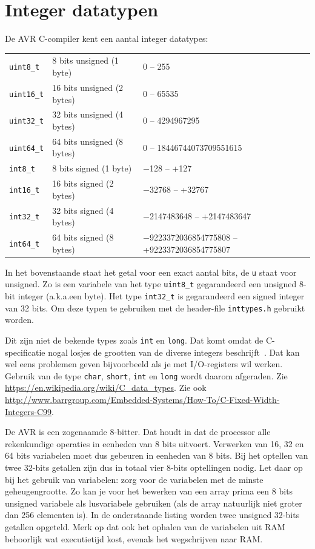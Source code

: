 \documentclass[12pt,a4paper,final,twoside,fleqn]{article}
\def\lstC{\lstinline[style=C]}
\begin{document}
\section{Integer datatypen }
\index{\lstC{uint}*\lstC{_t}}\index{\lstC{int}*\lstC{_t}}
De AVR C-compiler kent een aantal integer datatypes:

\begin{tabular}{lll}
\lstC|uint8_t| & 8 bits unsigned (1 byte) & 0 -- 255 \\ 
\lstC|uint16_t| & 16 bits unsigned (2 bytes) & 0 -- 65535 \\ 
\lstC|uint32_t| & 32 bits unsigned (4 bytes) & 0 -- 4294967295 \\
\lstC|uint64_t| & 64 bits unsigned (8 bytes) & 0 -- 18446744073709551615 \\
\lstC|int8_t| & 8 bits signed  (1 byte) & $-$128 -- +127 \\ 
\lstC|int16_t| & 16 bits signed (2 bytes) & $-$32768 -- +32767\\ 
\lstC|int32_t| & 32 bits signed (4 bytes) & $-$2147483648 -- +2147483647 \\ 
\lstC|int64_t| & 64 bits signed (8 bytes) & $-$9223372036854775808 -- +9223372036854775807 \\ 
\end{tabular}

In het bovenstaande staat het getal voor een exact aantal bits, de \lstC{u} staat voor
unsigned. Zo is een variabele van het type \lstC{uint8_t} gegarandeerd een unsigned
8-bit integer (a.k.a.\@ een byte). Het type \lstC{int32_t} is gegarandeerd een
signed integer van 32 bits. Om deze typen te gebruiken met de header-file
\lstC{inttypes.h} gebruikt worden.

Dit zijn niet de bekende types zoals \lstC{int} en \lstC{long}. Dat komt omdat de
C-specificatie nogal losjes de grootten van de diverse integers
beschrijft~\cite{isocdraft2005_2}. Dat kan wel eens problemen geven bijvoorbeeld
als je met I/O-registers wil werken. Gebruik van de type \lstC{char}, \mbox{\lstC{short},}
\lstC{int} en \lstC{long} wordt daarom afgeraden.
Zie \url{https://en.wikipedia.org/wiki/C_data_types}. Zie ook
\url{http://www.barrgroup.com/Embedded-Systems/How-To/C-Fixed-Width-Integers-C99}.

De AVR is een zogenaamde 8-bitter. Dat houdt in dat de processor alle rekenkundige 
operaties in eenheden van 8 bits uitvoert. Verwerken van 16, 32 en 64 bits variabelen
moet dus gebeuren in eenheden van 8 bits. Bij het optellen van twee 32-bits getallen
zijn dus in totaal vier 8-bits optellingen nodig. Let daar op bij het gebruik van
variabelen: zorg voor de variabelen met de minste geheugengrootte. Zo kan je voor het
bewerken van een array prima een 8 bits unsigned variabele als lusvariabele gebruiken
(als de array natuurlijk niet groter dan 256 elementen is). In de onderstaande listing
worden twee unsigned 32-bits getallen opgeteld. Merk op dat ook het ophalen van de
variabelen uit RAM behoorlijk wat executietijd kost, evenals het wegschrijven naar RAM.
\end{document}
